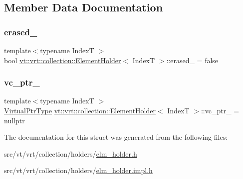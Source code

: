 \subsection{Member Data Documentation}
\mbox{\label{structvt_1_1vrt_1_1collection_1_1_element_holder_a25d5596b79044ad1d5b21c83820e0b1c}} 
\subsubsection{\texorpdfstring{erased\+\_\+}{erased\_}}
{\footnotesize\ttfamily template$<$typename IndexT $>$ \\
bool \hyperlink{structvt_1_1vrt_1_1collection_1_1_element_holder}{vt\+::vrt\+::collection\+::\+Element\+Holder}$<$ IndexT $>$\+::erased\+\_\+ = false}

\mbox{\label{structvt_1_1vrt_1_1collection_1_1_element_holder_ad84006b095efa23b1b9513e5f31e1d33}} 
\subsubsection{\texorpdfstring{vc\+\_\+ptr\+\_\+}{vc\_ptr\_}}
{\footnotesize\ttfamily template$<$typename IndexT $>$ \\
\hyperlink{structvt_1_1vrt_1_1collection_1_1_element_holder_aab2fd054199e1fed22be78fa1969eb2c}{Virtual\+Ptr\+Type} \hyperlink{structvt_1_1vrt_1_1collection_1_1_element_holder}{vt\+::vrt\+::collection\+::\+Element\+Holder}$<$ IndexT $>$\+::vc\+\_\+ptr\+\_\+ = nullptr}



The documentation for this struct was generated from the following files\+:\begin{DoxyCompactItemize}
\item 
src/vt/vrt/collection/holders/\hyperlink{elm__holder_8h}{elm\+\_\+holder.\+h}\item 
src/vt/vrt/collection/holders/\hyperlink{elm__holder_8impl_8h}{elm\+\_\+holder.\+impl.\+h}\end{DoxyCompactItemize}
